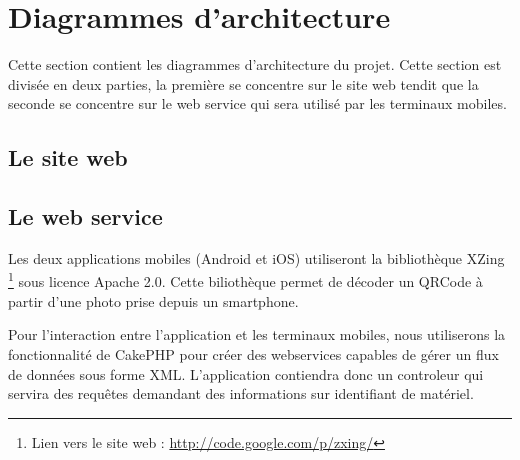 \chapter{Diagrammes d'architecture}

Cette section contient les diagrammes d'architecture du projet. Cette section est divisée en deux parties, la première se concentre sur le site web tendit que la seconde se concentre sur le web service qui sera utilisé par les terminaux mobiles.

\newpage
\section{Le site web}

\newpage
\section{Le web service}
Les deux applications mobiles (Android et iOS) utiliseront la bibliothèque XZing \footnote{Lien vers le site web : \href{http://code.google.com/p/zxing/}{http://code.google.com/p/zxing/}} sous licence Apache 2.0.
Cette biliothèque permet de décoder un QRCode à partir d'une photo prise depuis un smartphone.

Pour l'interaction entre l'application et les terminaux mobiles, nous utiliserons la fonctionnalité de CakePHP pour créer des webservices capables de gérer un flux de données sous forme XML.
L'application contiendra donc un controleur qui servira des requêtes demandant des informations sur identifiant de matériel.

